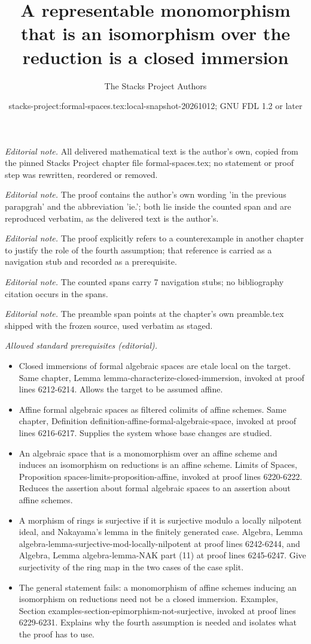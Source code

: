 \documentclass{stacks-project}
\title{A representable monomorphism that is an isomorphism over the reduction is a closed immersion}
\author{The Stacks Project Authors}
\date{stacks-project:formal-spaces.tex:local-snapshot-20261012; GNU FDL 1.2 or later}
\theoremstyle{plain}
\theoremstyle{definition}
\theoremstyle{remark}
\numberwithin{equation}{subsection}
\begin{document}
\maketitle
\noindent\textit{Editorial note.} All delivered mathematical text is the author's own, copied from the pinned Stacks Project chapter file formal-spaces.tex; no statement or proof step was rewritten, reordered or removed.\par\medskip
\noindent\textit{Editorial note.} The proof contains the author's own wording 'in the previous parapgrah' and the abbreviation 'ie.'; both lie inside the counted span and are reproduced verbatim, as the delivered text is the author's.\par\medskip
\noindent\textit{Editorial note.} The proof explicitly refers to a counterexample in another chapter to justify the role of the fourth assumption; that reference is carried as a navigation stub and recorded as a prerequisite.\par\medskip
\noindent\textit{Editorial note.} The counted spans carry 7 navigation stubs; no bibliography citation occurs in the spans.\par\medskip
\noindent\textit{Editorial note.} The preamble span points at the chapter's own preamble.tex shipped with the frozen source, used verbatim as staged.\par\medskip
\noindent\textit{Allowed standard prerequisites (editorial).}\begin{itemize}
\item Closed immersions of formal algebraic spaces are etale local on the target. Same chapter, Lemma lemma-characterize-closed-immersion, invoked at proof lines 6212-6214. Allows the target to be assumed affine.
\item Affine formal algebraic spaces as filtered colimits of affine schemes. Same chapter, Definition definition-affine-formal-algebraic-space, invoked at proof lines 6216-6217. Supplies the system whose base changes are studied.
\item An algebraic space that is a monomorphism over an affine scheme and induces an isomorphism on reductions is an affine scheme. Limits of Spaces, Proposition spaces-limits-proposition-affine, invoked at proof lines 6220-6222. Reduces the assertion about formal algebraic spaces to an assertion about affine schemes.
\item A morphism of rings is surjective if it is surjective modulo a locally nilpotent ideal, and Nakayama's lemma in the finitely generated case. Algebra, Lemma algebra-lemma-surjective-mod-locally-nilpotent at proof lines 6242-6244, and Algebra, Lemma algebra-lemma-NAK part (11) at proof lines 6245-6247. Give surjectivity of the ring map in the two cases of the case split.
\item The general statement fails: a monomorphism of affine schemes inducing an isomorphism on reductions need not be a closed immersion. Examples, Section examples-section-epimorphism-not-surjective, invoked at proof lines 6229-6231. Explains why the fourth assumption is needed and isolates what the proof has to use.
\end{itemize}\medskip
\end{document}
